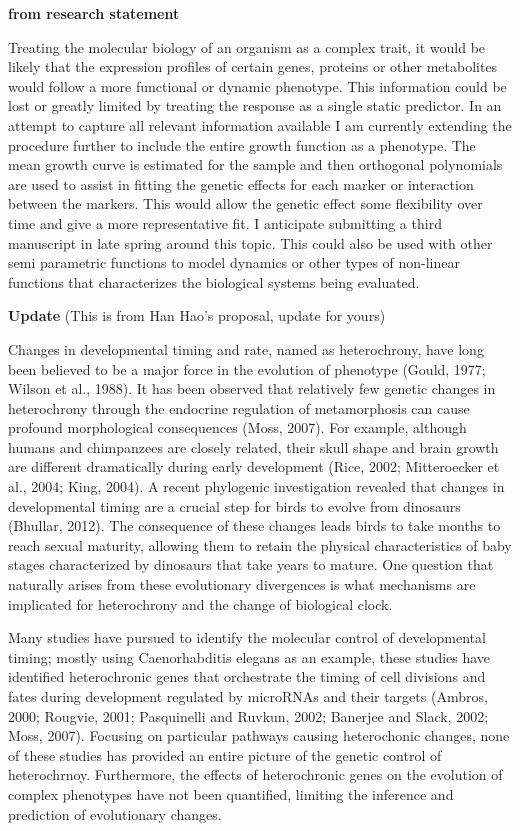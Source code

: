 \documentclass[]{book}
\theoremstyle{definition}
\theoremstyle{definition}
\theoremstyle{remark}
\begin{document}
\textbf{from research statement}

Treating the molecular biology of an organism as a complex trait, it
would be likely that the expression profiles of certain genes, proteins
or other metabolites would follow a more functional or dynamic
phenotype. This information could be lost or greatly limited by treating
the response as a single static predictor. In an attempt to capture all
relevant information available I am currently extending the procedure
further to include the entire growth function as a phenotype. The mean
growth curve is estimated for the sample and then orthogonal polynomials
are used to assist in fitting the genetic effects for each marker or
interaction between the markers. This would allow the genetic effect
some flexibility over time and give a more representative fit. I
anticipate submitting a third manuscript in late spring around this
topic. This could also be used with other semi parametric functions to
model dynamics or other types of non-linear functions that characterizes
the biological systems being evaluated.

\textbf{Update} (This is from Han Hao's proposal, update for yours)

Changes in developmental timing and rate, named as heterochrony, have
long been believed to be a major force in the evolution of phenotype
(Gould, 1977; Wilson et al., 1988). It has been observed that relatively
few genetic changes in heterochrony through the endocrine regulation of
metamorphosis can cause profound morphological consequences (Moss,
2007). For example, although humans and chimpanzees are closely related,
their skull shape and brain growth are different dramatically during
early development (Rice, 2002; Mitteroecker et al., 2004; King, 2004). A
recent phylogenic investigation revealed that changes in developmental
timing are a crucial step for birds to evolve from dinosaurs (Bhullar,
2012). The consequence of these changes leads birds to take months to
reach sexual maturity, allowing them to retain the physical
characteristics of baby stages characterized by dinosaurs that take
years to mature. One question that naturally arises from these
evolutionary divergences is what mechanisms are implicated for
heterochrony and the change of biological clock.

Many studies have pursued to identify the molecular control of
developmental timing; mostly using Caenorhabditis elegans as an example,
these studies have identified heterochronic genes that orchestrate the
timing of cell divisions and fates during development regulated by
microRNAs and their targets (Ambros, 2000; Rougvie, 2001; Pasquinelli
and Ruvkun, 2002; Banerjee and Slack, 2002; Moss, 2007). Focusing on
particular pathways causing heterochonic changes, none of these studies
has provided an entire picture of the genetic control of heterochrnoy.
Furthermore, the effects of heterochronic genes on the evolution of
complex phenotypes have not been quantified, limiting the inference and
prediction of evolutionary changes.
\end{document}
